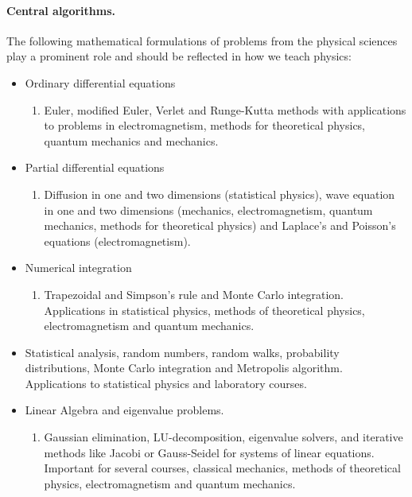 \documentclass[%
oneside,                 %
final,                   %
10pt]{article}
\begin{document}
\paragraph{Central algorithms.}
The following mathematical formulations of problems from the physical sciences play a prominent role and should be reflected in how we teach physics:
\begin{itemize}
 \item Ordinary differential equations
\begin{enumerate}

  \item Euler, modified Euler, Verlet and Runge-Kutta methods with applications to problems in electromagnetism, methods for theoretical physics, quantum mechanics and mechanics.

\end{enumerate}

\noindent
 \item Partial differential equations
\begin{enumerate}

  \item Diffusion in one and two dimensions (statistical physics), wave equation in one and two dimensions (mechanics, electromagnetism, quantum mechanics, methods for theoretical physics) and Laplace's and Poisson's equations (electromagnetism).

\end{enumerate}

\noindent
 \item Numerical integration
\begin{enumerate}

  \item Trapezoidal and Simpson's rule and Monte Carlo integration. Applications in statistical physics, methods of theoretical physics, electromagnetism and quantum mechanics.

\end{enumerate}

\noindent
 \item Statistical analysis, random numbers, random walks, probability distributions, Monte Carlo integration and Metropolis algorithm. Applications to statistical physics and laboratory courses.

 \item Linear Algebra and eigenvalue problems.
\begin{enumerate}

  \item Gaussian elimination, LU-decomposition, eigenvalue solvers, and iterative methods like  Jacobi or Gauss-Seidel for systems of linear equations. Important for several courses, classical mechanics, methods of theoretical physics, electromagnetism and quantum mechanics.


\end{enumerate}
\end{itemize}
\end{document}
